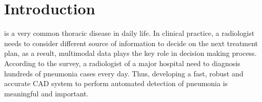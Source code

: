\documentclass[journal]{IEEEtran}
\begin{document}
%
\IEEEpeerreviewmaketitle

\section{Introduction}
\label{intro}
% 
% 
% 
% 
 is a very common thoracic disease in daily life. In clinical practice, a radiologist needs to consider different source of information to decide on the next treatment plan, as a result, multimodal data plays the key role in decision making process. According to the survey, a radiologist of a major hospital need to diagnosis hundreds of pneumonia cases every day. Thus, developing a fast, robust and accurate CAD system to perform automated detection of pneumonia is meaningful and important. 
\end{document}
